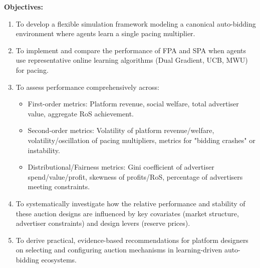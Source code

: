 \documentclass[12pt, a4paper]{article}
\begin{document}
\textbf{Objectives:}
\begin{enumerate}
    \item To develop a flexible simulation framework modeling a canonical auto-bidding environment where agents learn a single pacing multiplier.
    \item To implement and compare the performance of FPA and SPA when agents use representative online learning algorithms (Dual Gradient, UCB, MWU) for pacing.
    \item To assess performance comprehensively across:
        \begin{itemize}
            \item First-order metrics: Platform revenue, social welfare, total advertiser value, aggregate RoS achievement.
            \item Second-order metrics: Volatility of platform revenue/welfare, volatility/oscillation of pacing multipliers, metrics for "bidding crashes" or instability.
            \item Distributional/Fairness metrics: Gini coefficient of advertiser spend/value/profit, skewness of profits/RoS, percentage of advertisers meeting constraints.
        \end{itemize}
    \item To systematically investigate how the relative performance and stability of these auction designs are influenced by key covariates (market structure, advertiser constraints) and design levers (reserve prices).
    \item To derive practical, evidence-based recommendations for platform designers on selecting and configuring auction mechanisms in learning-driven auto-bidding ecosystems.
\end{enumerate}
\end{document}
